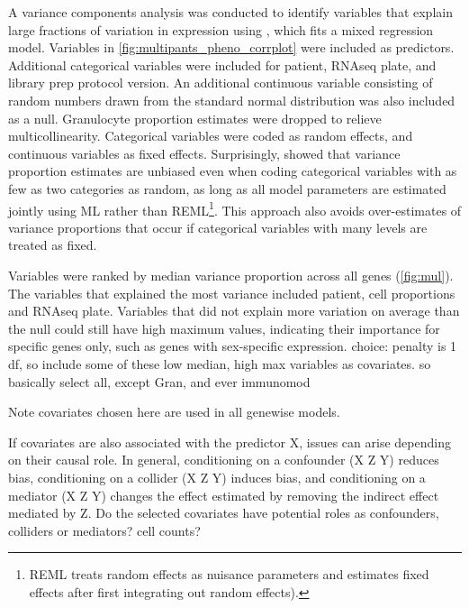 \begin{outline}
A variance components analysis was conducted to identify variables that explain large fractions of variation in expression
using \autocite{hoffman2016VariancePartitionInterpretingDrivers}, which fits a mixed regression model.
Variables in \autoref{fig:multipants_pheno_corrplot} were included as predictors.
Additional categorical variables were included for patient, \gls{RNAseq} plate, and library prep protocol version.
An additional continuous variable consisting of random numbers drawn from the standard normal distribution was also included as a null.
Granulocyte proportion estimates were dropped to relieve multicollinearity.
Categorical variables were coded as random effects, and continuous variables as fixed effects.
Surprisingly, \textcite{hoffman2016VariancePartitionInterpretingDrivers} showed that variance proportion estimates are unbiased even when coding categorical variables with as few as two categories as random, 
as long as all model parameters are estimated jointly using \gls{ML} rather than \gls{REML}\footnote{
    \gls{REML} treats random effects as nuisance parameters and estimates fixed effects after first integrating out random effects).
}.
This approach also avoids over-estimates of variance proportions that occur if categorical variables with many levels are treated as fixed.

\1 Variables were ranked by median variance proportion across all genes (\autoref{fig:mul}).
The variables that explained the most variance included patient, cell proportions and \gls{RNAseq} plate.
Variables that did not explain more variation on average than the null could still have high maximum values, 
indicating their importance for specific genes only, such as genes with sex-specific expression.
    \2 choice: penalty is 1 df, so include some of these low median, high max variables as covariates.
    \2 so basically select all, except Gran, and ever immunomod

Note covariates chosen here are used in all genewise models.

\1 If covariates are also associated with the predictor X, issues can arise depending on their causal role.
In general,
conditioning on a confounder (X \textleftarrow Z \textrightarrow Y) reduces bias,
conditioning on a collider (X \textrightarrow Z \textleftarrow Y) induces bias,
and conditioning on a mediator (X \textrightarrow Z \textrightarrow Y) changes the effect estimated by removing the indirect effect mediated by Z.
    \2 Do the selected covariates have potential roles as confounders, colliders or mediators?
    \2 cell counts?


\end{outline}
